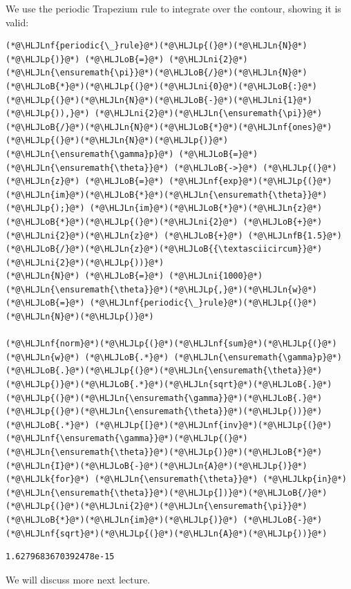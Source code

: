 \documentclass[12pt,a4paper]{article}
\newcommand{\HLJLk}[1]{\textcolor[RGB]{148,91,176}{\textbf{#1}}}
\newcommand{\HLJLkp}[1]{\textcolor[RGB]{148,91,176}{\textbf{#1}}}
\newcommand{\HLJLn}[1]{#1}
\newcommand{\HLJLnf}[1]{\textcolor[RGB]{66,102,213}{#1}}
\newcommand{\HLJLnfB}[1]{\textcolor[RGB]{59,151,46}{#1}}
\newcommand{\HLJLni}[1]{\textcolor[RGB]{59,151,46}{#1}}
\newcommand{\HLJLoB}[1]{\textcolor[RGB]{102,102,102}{\textbf{#1}}}
\newcommand{\HLJLp}[1]{#1}
\begin{document}
We use the periodic Trapezium rule to integrate over the contour, showing it is valid:


\begin{lstlisting}
(*@\HLJLnf{periodic{\_}rule}@*)(*@\HLJLp{(}@*)(*@\HLJLn{N}@*)(*@\HLJLp{)}@*) (*@\HLJLoB{=}@*) (*@\HLJLni{2}@*)(*@\HLJLn{\ensuremath{\pi}}@*)(*@\HLJLoB{/}@*)(*@\HLJLn{N}@*)(*@\HLJLoB{*}@*)(*@\HLJLp{(}@*)(*@\HLJLni{0}@*)(*@\HLJLoB{:}@*)(*@\HLJLp{(}@*)(*@\HLJLn{N}@*)(*@\HLJLoB{-}@*)(*@\HLJLni{1}@*)(*@\HLJLp{)),}@*) (*@\HLJLni{2}@*)(*@\HLJLn{\ensuremath{\pi}}@*)(*@\HLJLoB{/}@*)(*@\HLJLn{N}@*)(*@\HLJLoB{*}@*)(*@\HLJLnf{ones}@*)(*@\HLJLp{(}@*)(*@\HLJLn{N}@*)(*@\HLJLp{)}@*)
(*@\HLJLn{\ensuremath{\gamma}p}@*) (*@\HLJLoB{=}@*) (*@\HLJLn{\ensuremath{\theta}}@*) (*@\HLJLoB{->}@*) (*@\HLJLp{(}@*)(*@\HLJLn{z}@*) (*@\HLJLoB{=}@*) (*@\HLJLnf{exp}@*)(*@\HLJLp{(}@*)(*@\HLJLn{im}@*)(*@\HLJLoB{*}@*)(*@\HLJLn{\ensuremath{\theta}}@*)(*@\HLJLp{);}@*) (*@\HLJLn{im}@*)(*@\HLJLoB{*}@*)(*@\HLJLn{z}@*)(*@\HLJLoB{*}@*)(*@\HLJLp{(}@*)(*@\HLJLni{2}@*) (*@\HLJLoB{+}@*) (*@\HLJLni{2}@*)(*@\HLJLn{z}@*) (*@\HLJLoB{+}@*) (*@\HLJLnfB{1.5}@*)(*@\HLJLoB{/}@*)(*@\HLJLn{z}@*)(*@\HLJLoB{{\textasciicircum}}@*)(*@\HLJLni{2}@*)(*@\HLJLp{))}@*)
(*@\HLJLn{N}@*) (*@\HLJLoB{=}@*) (*@\HLJLni{1000}@*)
(*@\HLJLn{\ensuremath{\theta}}@*)(*@\HLJLp{,}@*)(*@\HLJLn{w}@*) (*@\HLJLoB{=}@*) (*@\HLJLnf{periodic{\_}rule}@*)(*@\HLJLp{(}@*)(*@\HLJLn{N}@*)(*@\HLJLp{)}@*)

(*@\HLJLnf{norm}@*)(*@\HLJLp{(}@*)(*@\HLJLnf{sum}@*)(*@\HLJLp{(}@*)(*@\HLJLn{w}@*) (*@\HLJLoB{.*}@*) (*@\HLJLn{\ensuremath{\gamma}p}@*)(*@\HLJLoB{.}@*)(*@\HLJLp{(}@*)(*@\HLJLn{\ensuremath{\theta}}@*)(*@\HLJLp{)}@*)(*@\HLJLoB{.*}@*)(*@\HLJLn{sqrt}@*)(*@\HLJLoB{.}@*)(*@\HLJLp{(}@*)(*@\HLJLn{\ensuremath{\gamma}}@*)(*@\HLJLoB{.}@*)(*@\HLJLp{(}@*)(*@\HLJLn{\ensuremath{\theta}}@*)(*@\HLJLp{))}@*) (*@\HLJLoB{.*}@*) (*@\HLJLp{[}@*)(*@\HLJLnf{inv}@*)(*@\HLJLp{(}@*)(*@\HLJLnf{\ensuremath{\gamma}}@*)(*@\HLJLp{(}@*)(*@\HLJLn{\ensuremath{\theta}}@*)(*@\HLJLp{)}@*)(*@\HLJLoB{*}@*)(*@\HLJLn{I}@*)(*@\HLJLoB{-}@*)(*@\HLJLn{A}@*)(*@\HLJLp{)}@*) (*@\HLJLk{for}@*) (*@\HLJLn{\ensuremath{\theta}}@*) (*@\HLJLkp{in}@*) (*@\HLJLn{\ensuremath{\theta}}@*)(*@\HLJLp{])}@*)(*@\HLJLoB{/}@*)(*@\HLJLp{(}@*)(*@\HLJLni{2}@*)(*@\HLJLn{\ensuremath{\pi}}@*)(*@\HLJLoB{*}@*)(*@\HLJLn{im}@*)(*@\HLJLp{)}@*) (*@\HLJLoB{-}@*) (*@\HLJLnf{sqrt}@*)(*@\HLJLp{(}@*)(*@\HLJLn{A}@*)(*@\HLJLp{))}@*)
\end{lstlisting}

\begin{lstlisting}
1.6279683670392478e-15
\end{lstlisting}


We will discuss more next lecture.
\end{document}
